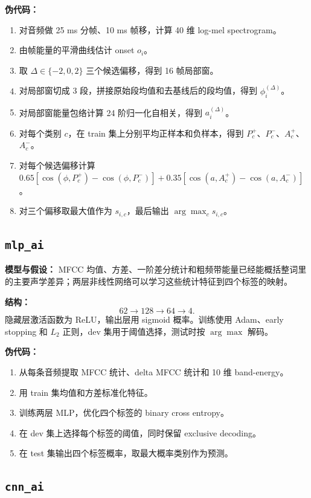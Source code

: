 \textbf{伪代码：}
\begin{enumerate}[nosep]
    \item 对音频做 25 ms 分帧、10 ms 帧移，计算 40 维 log-mel spectrogram。
    \item 由帧能量的平滑曲线估计 onset $o_i$。
    \item 取 $\Delta\in\{-2,0,2\}$ 三个候选偏移，得到 16 帧局部窗。
    \item 对局部窗切成 3 段，拼接原始段均值和去基线后的段均值，得到 $\phi_i^{(\Delta)}$。
    \item 对局部窗能量包络计算 24 阶归一化自相关，得到 $a_i^{(\Delta)}$。
    \item 对每个类别 $c$，在 train 集上分别平均正样本和负样本，得到 $P_c^+$、$P_c^-$、$A_c^+$、$A_c^-$。
    \item 对每个候选偏移计算 $0.65[\cos(\phi,P_c^+)-\cos(\phi,P_c^-)]+0.35[\cos(a,A_c^+)-\cos(a,A_c^-)]$。
    \item 对三个偏移取最大值作为 $s_{i,c}$，最后输出 $\arg\max_c s_{i,c}$。
\end{enumerate}

\subsection{\texttt{mlp\_ai}}
\label{alg:mlp-ai}

\textbf{模型与假设：} MFCC 均值、方差、一阶差分统计和粗频带能量已经能概括整词里的主要声学差异；两层非线性网络可以学习这些统计特征到四个标签的映射。

\textbf{结构：}
\[
62\rightarrow128\rightarrow64\rightarrow4.
\]
隐藏层激活函数为 ReLU，输出层用 sigmoid 概率。训练使用 Adam、early stopping 和 $L_2$ 正则，dev 集用于阈值选择，测试时按 $\arg\max$ 解码。

\textbf{伪代码：}
\begin{enumerate}[nosep]
    \item 从每条音频提取 MFCC 统计、delta MFCC 统计和 10 维 band-energy。
    \item 用 train 集均值和方差标准化特征。
    \item 训练两层 MLP，优化四个标签的 binary cross entropy。
    \item 在 dev 集上选择每个标签的阈值，同时保留 exclusive decoding。
    \item 在 test 集输出四个标签概率，取最大概率类别作为预测。
\end{enumerate}

\subsection{\texttt{cnn\_ai}}
\label{alg:cnn-ai}


